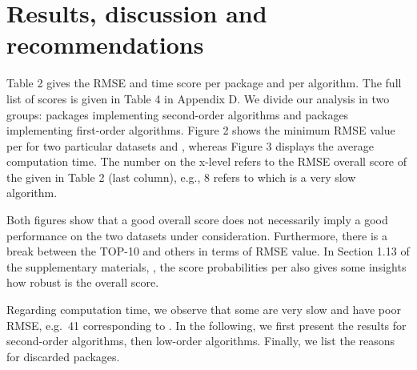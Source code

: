 \hypertarget{results-discussion-and-recommendations}{%
\section{Results, discussion and
recommendations}\label{results-discussion-and-recommendations}}

Table 2 gives the RMSE and time score per package and per algorithm. The
full list of scores is given in Table 4 in Appendix D. We divide our
analysis in two groups: packages implementing second-order algorithms
and packages implementing first-order algorithms. Figure 2 shows the
minimum RMSE value per  for two particular
datasets  and , whereas Figure 3
displays the average computation time. The number on the x-level refers
to the RMSE overall score of the  given in Table
2 (last column), e.g., 8 refers to  which is a
very slow algorithm.

Both figures show that a good overall score does not necessarily imply a
good performance on the two datasets under consideration. Furthermore,
there is a break between the TOP-10  and others
in terms of RMSE value. In Section 1.13 of the supplementary materials,
\citep{suppl:material:paper}, the score probabilities per
 also gives some insights how robust is the
overall score.

Regarding computation time, we observe that some
 are very slow and have poor RMSE, e.g.~41
corresponding to . In the following, we first
present the results for second-order algorithms, then low-order
algorithms. Finally, we list the reasons for discarded packages.

